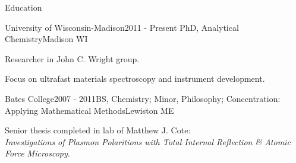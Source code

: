 \documentclass{resume}  %
\begin{document}
\begin{rSection}{Education}
  \begin{rSubsection}{University of Wisconsin-Madison}{2011 - Present}
    {PhD, Analytical Chemistry}{Madison WI}
    \item Researcher in John C. Wright group.
    \item Focus on ultrafast materials spectroscopy and instrument development.
  \end{rSubsection}
  \begin{rSubsection}{Bates College}{2007 - 2011}{BS, Chemistry; Minor, Philosophy; Concentration:
      Applying Mathematical Methods}{Lewiston ME}
    \item Senior thesis completed in lab of Matthew J. Cote: \\ \textit{Investigations of
      Plasmon Polaritions with Total Internal Reflection \& Atomic Force Microscopy}.
  \end{rSubsection}
\end{rSection}
\end{document}
